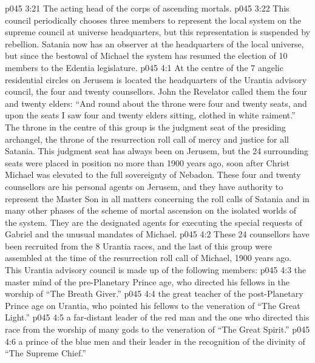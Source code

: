 \vs p045 3:21 \bibnobreakspace The acting head of the corps of ascending mortals.
\vs p045 3:22 \pc This council periodically chooses three members to represent the local system on the supreme council at universe headquarters, but this representation is suspended by rebellion. Satania now has an observer at the headquarters of the local universe, but since the bestowal of Michael the system has resumed the election of 10 members to the Edentia legislature.
\vs p045 4:1 At the centre of the 7 angelic residential circles on Jerusem is located the headquarters of the Urantia advisory council, the four and twenty counsellors. John the Revelator called them the four and twenty elders: “And round about the throne were four and twenty seats, and upon the seats I saw four and twenty elders sitting, clothed in white raiment.” The throne in the centre of this group is the judgment seat of the presiding archangel, the throne of the resurrection roll call of mercy and justice for all Satania. This judgment seat has always been on Jerusem, but the 24 surrounding seats were placed in position no more than 1900 years ago, soon after Christ Michael was elevated to the full sovereignty of Nebadon. These four and twenty counsellors are his personal agents on Jerusem, and they have authority to represent the Master Son in all matters concerning the roll calls of Satania and in many other phases of the scheme of mortal ascension on the isolated worlds of the system. They are the designated agents for executing the special requests of Gabriel and the unusual mandates of Michael.
\vs p045 4:2 These 24 counsellors have been recruited from the 8 Urantia races, and the last of this group were assembled at the time of the resurrection roll call of Michael, 1900 years ago. This Urantia advisory council is made up of the following members:
\vs p045 4:3 \bibnobreakspace {} the master mind of the pre\hyp{}Planetary Prince age, who directed his fellows in the worship of “The Breath Giver.”
\vs p045 4:4 \bibnobreakspace {} the great teacher of the post\hyp{}Planetary Prince age on Urantia, who pointed his fellows to the veneration of “The Great Light.”
\vs p045 4:5 \bibnobreakspace {} a far\hyp{}distant leader of the red man and the one who directed this race from the worship of many gods to the veneration of “The Great Spirit.”
\vs p045 4:6 \bibnobreakspace {} a prince of the blue men and their leader in the recognition of the divinity of “The Supreme Chief.”
